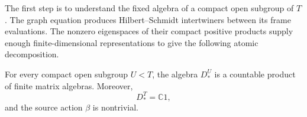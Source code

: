 The first step is to understand the fixed algebra of a compact open
subgroup of $T$.  The graph equation produces Hilbert--Schmidt
intertwiners between its frame evaluations.  The nonzero eigenspaces
of their compact positive products supply enough finite-dimensional
representations to give the following atomic decomposition.

\begin{proposition}
\label{prop:finite-frame}
For every compact open subgroup $U<T$, the algebra $D_*^U$ is a
countable product of finite matrix algebras.  Moreover,
\begin{equation}
 D_*^T=\mathbb C1,
 \label{eq:finite-fixed}
\end{equation}
and the source action $\beta$ is nontrivial.
\end{proposition}

